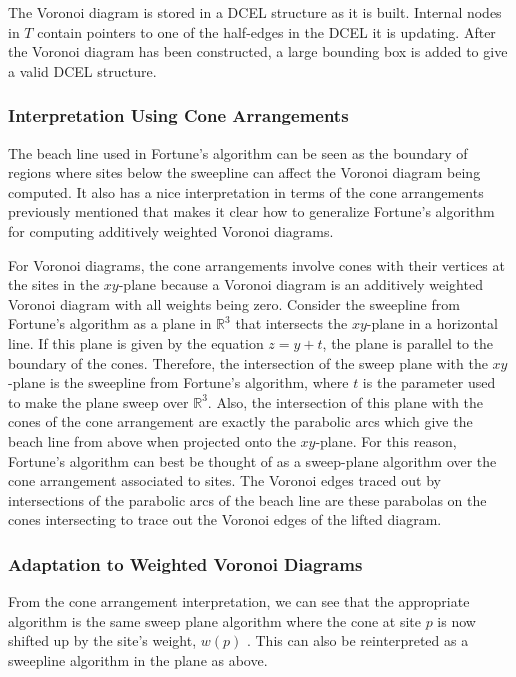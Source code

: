 \documentclass[a4paper, 11pt]{article}
\newcommand{\R}{\mathbb{R}}
\begin{document}
The Voronoi diagram is stored in a DCEL structure as it is built. Internal nodes in $T$ contain pointers to one of the half-edges in the DCEL it is
updating. After the Voronoi diagram has been constructed, a large bounding box is added to give a valid DCEL structure.

\subsubsection{Interpretation Using Cone Arrangements}

The beach line used in Fortune's algorithm can be seen as the boundary of regions where sites below the sweepline can affect the Voronoi diagram being
computed. It also has a nice interpretation in terms of the cone arrangements previously mentioned that makes it clear how to generalize Fortune's
algorithm for computing additively weighted Voronoi diagrams.

For Voronoi diagrams, the cone arrangements involve cones with their vertices at the sites in the $xy$-plane because a Voronoi diagram is an
additively weighted Voronoi diagram with all weights being zero. Consider the sweepline from Fortune's algorithm as a plane in $\R^3$ that intersects
the $xy$-plane in a horizontal line. If this plane is given by the equation $z = y + t$, the plane is parallel to the boundary of the cones.
Therefore, the intersection of the sweep plane with the $xy$-plane is the sweepline from
Fortune's algorithm, where $t$ is the parameter used to make the plane sweep over $\R^3$. Also, the intersection of this plane with the cones of the
cone arrangement are exactly the parabolic arcs which give the beach line from above when projected onto the $xy$-plane. For this reason, Fortune's algorithm can best be thought of as a sweep-plane
algorithm over the cone arrangement associated to sites. The Voronoi edges traced out by intersections of the parabolic arcs of the beach line are
these parabolas on the cones intersecting to trace out the Voronoi edges of the lifted diagram.

\subsubsection{Adaptation to Weighted Voronoi Diagrams}
From the cone arrangement interpretation, we can see that the appropriate algorithm is the same sweep plane algorithm where the cone at site $p$ is
now shifted up by the site's weight, $w(p)$ \cite{rosenberger_additive}. This can also be reinterpreted as a sweepline algorithm in the plane as
above.
\end{document}
